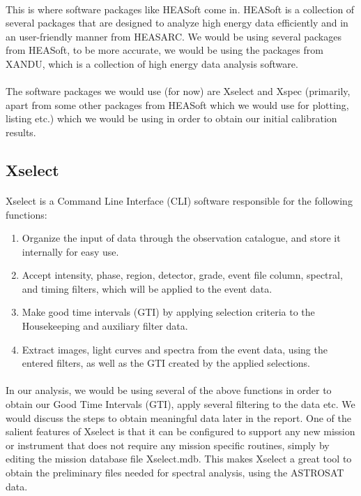 \documentclass[a4paper,twoside]{report}
\numberwithin{equation}{section}
\begin{document}
\paragraph{}
This is where software packages like HEASoft come in. HEASoft is a collection of several packages that are designed to analyze high energy data efficiently and in an user-friendly manner from HEASARC. We would be using several packages from HEASoft, to be more accurate, we would be using the packages from XANDU, which is a collection of high energy data analysis software.
\paragraph{}
The software packages we would use (for now) are Xselect and Xspec (primarily, apart from some other packages from HEASoft which we would use for plotting, listing etc.) which we would be using in order to obtain our initial calibration results.
\subsection{Xselect}
\paragraph{}
Xselect is a Command Line Interface (CLI) software responsible for the following functions:
\begin{enumerate}
\item Organize the input of data through the observation catalogue, and store it internally for easy use.
\item Accept intensity, phase, region, detector, grade, event file column, spectral, and timing filters, which will be applied to the event data.
\item Make good time intervals (GTI) by applying selection criteria to the Housekeeping and auxiliary filter data.
\item Extract images, light curves and spectra from the event data, using the entered filters, as well as the GTI created by the applied selections.
\end{enumerate}
\paragraph{}
In our analysis, we would be using several of the above functions in order to obtain our Good Time Intervals (GTI), apply several filtering to the data etc. We would discuss the steps to obtain meaningful data later in the report. One of the salient features of Xselect is that it can be configured to support any new mission or instrument that does not require any mission specific routines, simply by editing the mission database file Xselect.mdb. This makes Xselect a great tool to obtain the preliminary files needed for  spectral analysis, using the ASTROSAT data. 
\end{document}
